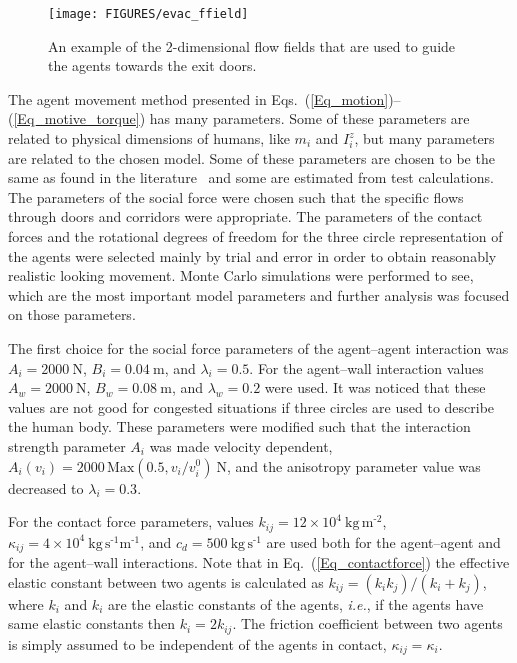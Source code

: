 \documentclass[12pt,a4paper,final,twoside]{stylevk}
\begin{document}
%
\begin{figure}[!tb]
  \centerline{\texttt{[image: FIGURES/evac\_ffield]}}
  \caption{An example of the 2-dimensional flow fields that are used
    to guide the agents towards the exit doors.}\label{Fig_EvacFlowField}
\end{figure}
%

The agent movement method presented in
Eqs.~(\ref{Eq_motion})--(\ref{Eq_motive_torque}) has many parameters.
Some of these parameters are related to physical dimensions of humans,
like $m_i$ and $I^z_{i}$, but many parameters are related to the
chosen model.  Some of these parameters are chosen to be the same as
found in the literature~\cite{Helbing00,Langston06} and some are
estimated from test calculations.  The parameters of the social force
were chosen such that the specific flows through doors and corridors
were appropriate.  The parameters of the contact forces and the
rotational degrees of freedom for the three circle representation of
the agents were selected mainly by trial and error in order to obtain
reasonably realistic looking movement.  Monte Carlo simulations were
performed to see, which are the most important model parameters and
further analysis was focused on those parameters.


The first choice for the social force parameters of the agent--agent
interaction was $A_i = 2000~\textrm{N}$, $B_i = 0.04~\textrm{m}$, and
$\lambda_i = 0.5$.  For the agent--wall interaction values $A_w =
2000~\textrm{N}$, $B_w = 0.08~\textrm{m}$, and $\lambda_w = 0.2$ were
used.  It was noticed that these values are not good for congested
situations if three circles are used to describe the human body.
These parameters were modified such that the interaction strength
parameter $A_i$ was made velocity dependent, $A_i(v_i) = 2000\,
\mathrm{Max}(0.5, v_i/v^0_i)~\textrm{N}$, and the anisotropy parameter
value was decreased to $\lambda_i = 0.3$.


For the contact force parameters, values $k_{ij} = 12 \times 10^4
~\mathrm{ \textrm{kg} \, \textrm{m}^\textrm{-2} }$, $\kappa_{ij} = 4
\times 10^4 ~\mathrm{ \textrm{kg} \, \textrm{s}^\textrm{-1}
  \textrm{m}^\textrm{-1} } $, and $c_d = 500 ~\mathrm{\textrm{kg} \,
  \textrm{s}^\textrm{-1} } $ are used both for the agent--agent and
for the agent--wall interactions.  Note that in
Eq.~(\ref{Eq_contactforce}) the effective elastic constant between two
agents is calculated as $k_{ij} = (k_i k_j)/(k_i+k_j)$, where $k_i$
and $k_i$ are the elastic constants of the agents, \emph{i.e.}, if the
agents have same elastic constants then $k_{i} = 2 k_{ij}$.  The
friction coefficient between two agents is simply assumed to be
independent of the agents in contact, $\kappa_{ij} = \kappa_i$.
\end{document}
